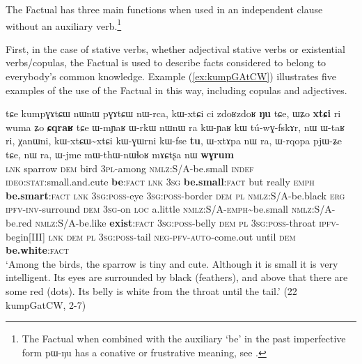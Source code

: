 \documentclass[oldfontcommands,oneside,a4paper,11pt]{article}
\newcommand{\ipa}[1]{{\phon \mbox{#1}}} %
\newcommand{\refb}[1]{(\ref{#1})}
\newcommand{\factual}[1]{\textsc{:fact}}
\newcommand{\rdp}{\textasciitilde{}}
\begin{document}
The Factual has three main functions when used in an independent clause without an auxiliary verb.\footnote{The Factual when combined with the auxiliary  `be' in the past imperfective form \ipa{pɯ-ŋu} has a conative or frustrative meaning, see \citealt[292]{jacques14linking}.}

First,  in the case of stative verbs, whether adjectival stative verbs or existential verbs/copulas, the Factual is used to describe facts considered to belong to everybody's common knowledge. Example \refb{ex:kumpGAtCW} illustrates five examples of the use of the Factual in this way, including copulas and adjectives. 

\begin{exe}
\ex \label{ex:kumpGAtCW}
\gll
\ipa{tɕe} 	\ipa{kumpɣɤtɕɯ} 	\ipa{nɯnɯ} 	\ipa{pɣɤtɕɯ} 	\ipa{nɯ-rca,} 
 \ipa{kɯ-xtɕi} 	\ipa{ci} 	\ipa{zdoʁzdoʁ} 	\ipa{\textbf{ŋu}} 	\ipa{tɕe,}  \ipa{ɯʑo} 	\ipa{\textbf{xtɕi}} 	\ipa{ri} 	\ipa{wuma} 	\ipa{ʑo} 	\ipa{\textbf{ɕqraʁ}} \ipa{tɕe}  	\ipa{ɯ-mɲaʁ} 	\ipa{ɯ-rkɯ} 	\ipa{nɯnɯ} 	\ipa{ra} \ipa{kɯ-ɲaʁ} 	\ipa{kɯ} 	\ipa{tú-wɣ-fskɤr,} 	 	\ipa{nɯ} 	\ipa{ɯ-taʁ} 	\ipa{ri,} 	\ipa{χanɯni,} 	\ipa{kɯ-xtɕɯ\rdp{}xtɕi} 	\ipa{kɯ-ɣɯrni} 	\ipa{kɯ-fse} 	\ipa{\textbf{tu},}  	\ipa{ɯ-xtɤpa} 	\ipa{nɯ} \ipa{ra,} 	\ipa{ɯ-rqopa} 	\ipa{pjɯ-ʑe} 	\ipa{tɕe,} 	\ipa{nɯ} \ipa{ra,}  \ipa{ɯ-jme} 	\ipa{mɯ-thɯ-nɯɬoʁ} 	\ipa{mɤɕtʂa} 	\ipa{nɯ} 	\ipa{\textbf{wɣrum}} \\
\textsc{lnk} sparrow \textsc{dem} bird \textsc{3pl}-among \textsc{nmlz}:S/A-be.small \textsc{indef} \textsc{ideo:stat}:small.and.cute \textbf{be}\factual{} \textsc{lnk}  \textsc{3sg} \textbf{be.small}\factual{} but really \textsc{emph} \textbf{be.smart}\factual{}  \textsc{lnk}  \textsc{3sg:poss}-eye \textsc{3sg:poss}-border \textsc{dem}  \textsc{pl}  \textsc{nmlz}:S/A-be.black \textsc{erg} \textsc{ipfv-inv}-surround \textsc{dem} \textsc{3sg}-on \textsc{loc} a.little \textsc{nmlz}:S/A-\textsc{emph}\rdp{}be.small \textsc{nmlz}:S/A-be.red \textsc{nmlz}:S/A-be.like \textbf{exist}\factual{} \textsc{3sg:poss}-belly \textsc{dem}  \textsc{pl}  \textsc{3sg:poss}-throat \textsc{ipfv}-begin[III] \textsc{lnk}   \textsc{dem}  \textsc{pl}  \textsc{3sg:poss}-tail \textsc{neg-pfv-auto}-come.out until \textsc{dem} \textbf{be.white}\factual{} \\
\glt `Among the birds, the sparrow is tiny and cute. Although it is small it is very intelligent. Its eyes are surrounded by black (feathers), and above that there are some red (dots). Its belly is white from the throat until the tail.' (22 kumpGatCW, 2-7)
\end{exe}
\end{document}
